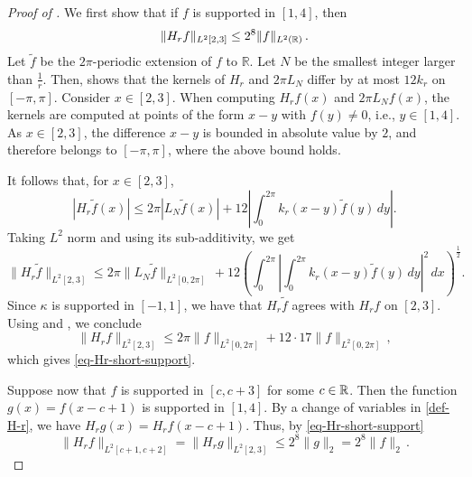 \begin{proof}[Proof of ]
    \leanok
    We first show that if $f$ is supported in $[1, 4]$, then
    \begin{equation}
        \label{eq-Hr-short-support}
        \|H_r f\|_{L^2[2, 3]} \le 2^{8} \|f\|_{L^2({\mathbb{R}})}\,.
    \end{equation}
    Let $\tilde{f}$ be the $2\pi$-periodic extension of $f$ to $\mathbb{R}$. Let $N$ be the smallest
    integer larger than $\frac 1r$. Then,  shows that the kernels of $H_r$ and $2\pi L_N$ differ by at
    most $12k_r$ on $[-\pi, \pi]$. Consider $x \in [2,3]$. When computing $H_r f(x)$ and $2\pi L_N f(x)$, the kernels are
    computed at points of the form $x-y$ with $f(y) \ne 0$, i.e., $y \in [1,4]$. As $x\in [2,3]$, the difference
    $x-y$ is bounded in absolute value by $2$, and therefore belongs to $[-\pi, \pi]$, where the above bound holds.

    It follows that, for $x \in [2,3]$,
    \begin{equation*}
        |H_r \tilde{f}(x)|\leq 2\pi |L_N \tilde{f}(x)|+12\left|\int_{0}^{2\pi}k_r(x-y)\tilde{f}(y)\, dy\right|.
    \end{equation*}
    Taking $L^2$ norm and using its sub-additivity, we get
    \begin{equation*}
       \|H_r \tilde{f}\|_{L^2[2, 3]}\leq 2\pi \|L_N \tilde{f}\|_{L^2[0, 2\pi]}\, + 12\left(\int_{0}^{2\pi} \left|\int_{0}^{2\pi}k_r(x-y)\tilde{f}(y)\, dy\right|^2\, dx\right)^{\frac{1}{2}}.
    \end{equation*}
    Since $\kappa$ is supported in $[-1,1]$, we have that $H_r\tilde{f}$ agrees with $H_r f$ on $[2,3]$.
    Using  and , we conclude
    \begin{equation}
        \|H_r f\|_{L^2[2, 3]} \le 2\pi \|f\|_{L^2[0, 2\pi]} + 12 \cdot 17 \|f\|_{L^2[0, 2\pi]}\,,
    \end{equation}
    which gives \eqref{eq-Hr-short-support}.

    Suppose now that $f$ is supported in $[c, c+3]$ for some $c \in {\mathbb{R}}$. Then the function $g(x) = f(x-c+1)$ is supported in $[1, 4]$.
    By a change of variables in \eqref{def-H-r}, we have $H_r g(x ) = H_r f(x - c + 1)$. Thus, by \eqref{eq-Hr-short-support}
    \begin{equation}
        \label{eq-Hr-short-support-2}
        \|H_rf\|_{L^2[c+1, c+2]} = \|H_r g\|_{L^2[2,3]} \le 2^{8} \|g\|_2 = 2^8 \|f\|_2\,.
    \end{equation}


\end{proof}

